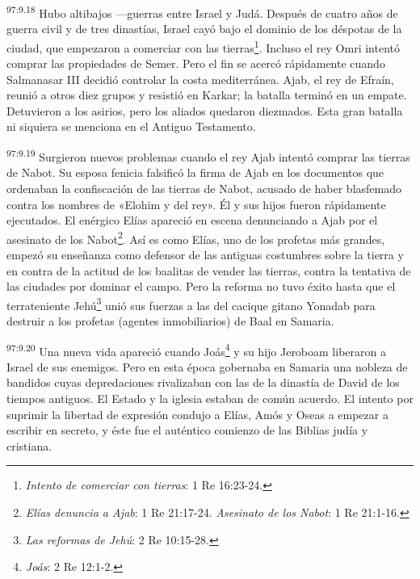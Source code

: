 \par
\textsuperscript{97:9.18} Hubo altibajos ---guerras entre Israel y Judá. Después de cuatro años de guerra civil y de tres dinastías, Israel cayó bajo el dominio de los déspotas de la ciudad, que empezaron a comerciar con las tierras\footnote{\textit{Intento de comerciar con tierras}: 1 Re 16:23-24.}. Incluso el rey Omri intentó comprar las propiedades de Semer. Pero el fin se acercó rápidamente cuando Salmanasar III decidió controlar la costa mediterránea. Ajab, el rey de Efraín, reunió a otros diez grupos y resistió en Karkar; la batalla terminó en un empate. Detuvieron a los asirios, pero los aliados quedaron diezmados. Esta gran batalla ni siquiera se menciona en el Antiguo Testamento.

\par
\textsuperscript{97:9.19} Surgieron nuevos problemas cuando el rey Ajab intentó comprar las tierras de Nabot. Su esposa fenicia falsificó la firma de Ajab en los documentos que ordenaban la confiscación de las tierras de Nabot, acusado de haber blasfemado contra los nombres de «Elohim y del rey». Él y sus hijos fueron rápidamente ejecutados. El enérgico Elías apareció en escena denunciando a Ajab por el asesinato de los Nabot\footnote{\textit{Elías denuncia a Ajab}: 1 Re 21:17-24. \textit{Asesinato de los Nabot}: 1 Re 21:1-16.}. Así es como Elías, uno de los profetas más grandes, empezó su enseñanza como defensor de las antiguas costumbres sobre la tierra y en contra de la actitud de los baalitas de vender las tierras, contra la tentativa de las ciudades por dominar el campo. Pero la reforma no tuvo éxito hasta que el terrateniente Jehú\footnote{\textit{Las reformas de Jehú}: 2 Re 10:15-28.} unió sus fuerzas a las del cacique gitano Yonadab para destruir a los profetas (agentes inmobiliarios) de Baal en Samaria.

\par
\textsuperscript{97:9.20} Una nueva vida apareció cuando Joás\footnote{\textit{Joás}: 2 Re 12:1-2.} y su hijo Jeroboam liberaron a Israel de sus enemigos. Pero en esta época gobernaba en Samaria una nobleza de bandidos cuyas depredaciones rivalizaban con las de la dinastía de David de los tiempos antiguos. El Estado y la iglesia estaban de común acuerdo. El intento por suprimir la libertad de expresión condujo a Elías, Amós y Oseas a empezar a escribir en secreto, y éste fue el auténtico comienzo de las Biblias judía y cristiana.

